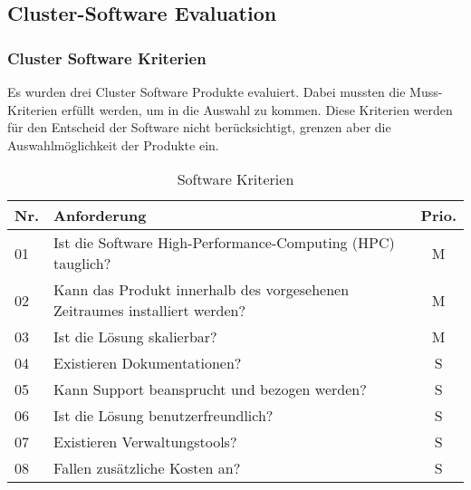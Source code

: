 \subsection{Cluster-Software Evaluation}
\subsubsection{Cluster Software Kriterien}
Es wurden drei Cluster Software Produkte evaluiert. Dabei mussten die Muss-Kriterien erfüllt werden, um in die Auswahl zu kommen. Diese Kriterien werden für den Entscheid der Software nicht berücksichtigt, grenzen aber die Auswahlmöglichkeit der Produkte ein.

\begin{table}[H]
\begin{tabular}[t]{p{0.7cm}|p{14cm}c}
\hline
\rowcolor{heading}\textbf{Nr.} & \textbf{Anforderung} & \textbf{Prio.} \\\hline
01 & Ist die Software High-Performance-Computing (HPC) tauglich? & M \\\hline
02 & Kann das Produkt innerhalb des vorgesehenen Zeitraumes installiert werden? & M \\\hline
03 & Ist die Lösung skalierbar? &  M \\\hline
04 & Existieren Dokumentationen? & S \\\hline
05 & Kann Support beansprucht und bezogen werden? & S \\\hline
06 & Ist die Lösung benutzerfreundlich? & S \\\hline
07 & Existieren Verwaltungstools? & S \\\hline
08 & Fallen zusätzliche Kosten an? & S \\\hline
\end{tabular}
\caption{Software Kriterien}
\end{table}

